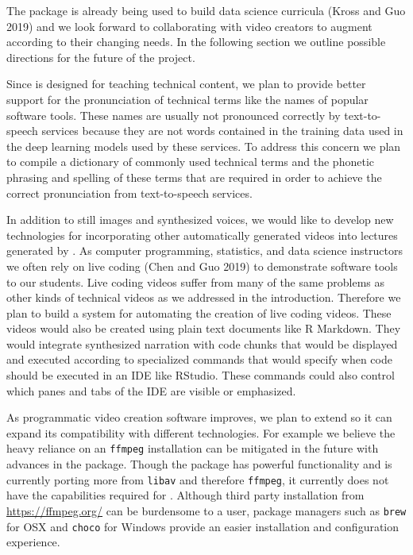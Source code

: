 The  package is already being used to build data science
curricula (Kross and Guo 2019) and we look forward to collaborating with
video creators to augment  according to their changing needs.
In the following section we outline possible directions for the future
of the project.

Since  is designed for teaching technical content, we plan to
provide better support for the pronunciation of technical terms like the
names of popular software tools. These names are usually not pronounced
correctly by text-to-speech services because they are not words
contained in the training data used in the deep learning models used by
these services. To address this concern we plan to compile a dictionary
of commonly used technical terms and the phonetic phrasing and spelling
of these terms that are required in order to achieve the correct
pronunciation from text-to-speech services.

In addition to still images and synthesized voices, we would like to
develop new technologies for incorporating other automatically generated
videos into lectures generated by . As computer programming,
statistics, and data science instructors we often rely on live coding
(Chen and Guo 2019) to demonstrate software tools to our students. Live
coding videos suffer from many of the same problems as other kinds of
technical videos as we addressed in the introduction. Therefore we plan
to build a system for automating the creation of live coding videos.
These videos would also be created using plain text documents like R
Markdown. They would integrate synthesized narration with code chunks
that would be displayed and executed according to specialized commands
that would specify when code should be executed in an IDE like RStudio.
These commands could also control which panes and tabs of the IDE are
visible or emphasized.

As programmatic video creation software improves, we plan to extend
 so it can expand its compatibility with different
technologies. For example we believe the heavy reliance on an
\texttt{ffmpeg} installation can be mitigated in the future with
advances in the  package. Though the  package has
powerful functionality and is currently porting more from \texttt{libav}
and therefore \texttt{ffmpeg}, it currently does not have the
capabilities required for . Although third party installation
from \url{https://ffmpeg.org/} can be burdensome to a user, package
managers such as \texttt{brew} for OSX and \texttt{choco} for Windows
provide an easier installation and configuration experience.

